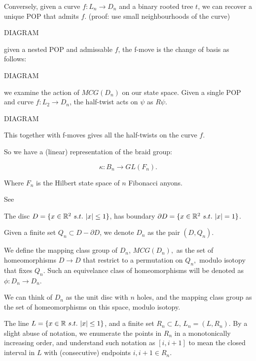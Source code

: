 \documentclass[12pt,a4paper]{article}
\begin{document}
Conversely, given a curve $f:L_n\to D_n$
and a binary rooted tree $t$,
we can recover a unique POP that admits $f$.
(proof: use small neighbourhoods of the curve)

DIAGRAM

 given a nested POP and admissable $f$,
the f-move is the change of basis as follows:

DIAGRAM

 we examine the action of $MCG(D_n)$
on our state space. Given a single POP and curve $f:L_2\to D_n$,
the half-twist acts on $\psi$ as $R\psi$.

DIAGRAM

This together with f-moves gives all the half-twists on
the curve $f$.

So we have a (linear) representation of the braid group:

    $$ \kappa : B_n \to GL(F_n).$$

Where $F_n$ is the Hilbert state space of $n$ Fibonacci anyons.

See \cite{Pfeifer12, Pfeifer14}




The disc $D = \{ x\in \mathR^2\ s.t.\ |x|\leq 1 \} $,
has boundary $\partial D = \{ x\in \mathbb{R}^2\ s.t.\ |x|=1 \} $.

Given a finite set $ Q_n \subset D-\partial D$,
we denote $D_n$ as the pair $(D, Q_n).$

We define the mapping class group of $D_n$,
$MCG(D_n),$ as the set of homeomorphisms $D\to D$ that
restrict to a permutation on $Q_n,$ modulo isotopy that
fixes $Q_n.$
Such an equivelance class
of homeomorphisms will be denoted as $\phi:D_n\to D_n.$

We can think of $D_n$ as the unit disc with $n$ holes,
and the mapping class group as the set of homeomorphisms on
this space, modulo isotopy.

The line $L = \{ x\in \mathbb{R}\ s.t.\ |x|\leq 1 \} $,
and a finite set $R_n\subset L$,
$L_n = (L, R_n).$
By a slight abuse of notation, we enumerate the points in $R_n$ 
in a monotonically increasing order,
and understand such notation as $[i, i+1]$ to mean the closed interval in $L$
with (consecutive) endpoints $i, i+1 \in R_n.$
\end{document}

